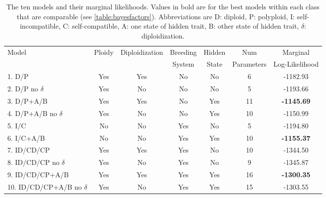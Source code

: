 \begin{table}
\begin{tabular}{lcccccc} \toprule
Model                        & Ploidy & Diploidization & Breeding  & Hidden & Num & Marginal \\
                             & &  &System & State & Parameters & Log-Likelihood \\ \midrule
1. D/P                       &	Yes  &	Yes &	No	&No	& 6	& -1182.93 \\
2. D/P no $\delta$           &	Yes & 	No	& No	& No & 	5 &	-1193.66\\
3. D/P+A/B                   &	Yes &	Yes	&No &	Yes &	11 &	\textbf{-1145.69}\\
4. D/P+A/B no $\delta$       &	Yes & No &	No &	Yes &	10	&-1150.99\\
5. I/C                       &	No & No	&Yes &	No &	 5 &  -1194.80 \\
6. I/C+A/B                   &	No &	 No	&Yes &	Yes	& 10 & \textbf{-1155.37}\\
7. ID/CD/CP                  &	Yes & 	Yes &	Yes &	No &	10 & -1344.50\\
8. ID/CD/CP no $\delta$      &	Yes & 	No &	Yes	&No &	9 &-1345.87\\
9. ID/CD/CP+A/B              &	Yes 	&Yes &	Yes &	Yes &	16 & \textbf{-1300.35} \\
10. ID/CD/CP+A/B no $\delta$ & Yes & 	No	&Yes &	Yes	&15 &-1303.55 \\ \bottomrule
\end{tabular}
\caption{
    The ten models and their marginal likelihoods.
    Values in bold are for the best models within each class that are comparable (see \cref{table:bayesfactors}).
    Abbreviations are D: diploid, P: polyploid, I: self-incompatible, C: self-compatible, A: one state of hidden trait, B: other state of hidden trait, $\delta$: diploidization.}
\label{table:marginallike}
\end{table}

